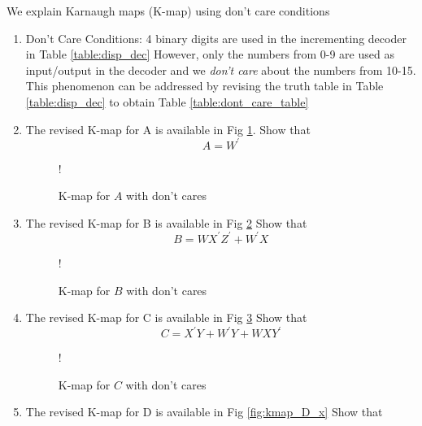 We explain Karnaugh maps (K-map) using don't care conditions
%
\begin{enumerate}[label=\arabic*.,ref=\theenumi]
\item {Don't Care Conditions: }
4 binary digits are used in the incrementing decoder in 
		Table 
\ref{table:disp_dec}
		However, only the numbers from 0-9 are used as input/output
in the decoder and we {\em don't care} about the numbers from 10-15.  This phenomenon can be addressed by revising the truth table in 
		Table 
\ref{table:disp_dec}
to obtain Table \ref{table:dont_care_table}
\begin{table*}[!ht]
	\centering

\caption{}
\label{table:dont_care_table}
\end{table*}
\item  The revised K-map for A is available in Fig \ref{fig:kmap_A_x}.  Show that 
\begin{equation}
A = {W}^{\prime}
\end{equation}
\begin{figure}[H]
	\centering
\resizebox {0.5\columnwidth} {!} {

}
\caption{K-map for $A$ with don't cares}
\label{fig:kmap_A_x}
\end{figure}
%
\item  The revised K-map for B is available in Fig \ref{fig:kmap_B_x}  Show that 
%
\begin{equation}
B = WX^{\prime}Z^{\prime} + W^{\prime}X
\end{equation}
\begin{figure}[H]
	\centering
\resizebox {0.5\columnwidth} {!} {

}
\caption{K-map for $B$ with don't cares}
\label{fig:kmap_B_x}
\end{figure}
%
\item  The revised K-map for C is available in Fig \ref{fig:kmap_C_x}  Show that 
%
\begin{equation}
C = {X}^{\prime}{Y} + {W}^{\prime}{Y} + {W}{X}{Y}^{\prime}
\end{equation}
\begin{figure}[H]
	\centering
\resizebox {0.5\columnwidth} {!} {

}
\caption{K-map for $C$ with don't cares}
\label{fig:kmap_C_x}
\end{figure}
%
\item  The revised K-map for D is available in Fig \ref{fig:kmap_D_x}  Show that 
%
\begin{equation}

\end{equation}
\end{enumerate}
